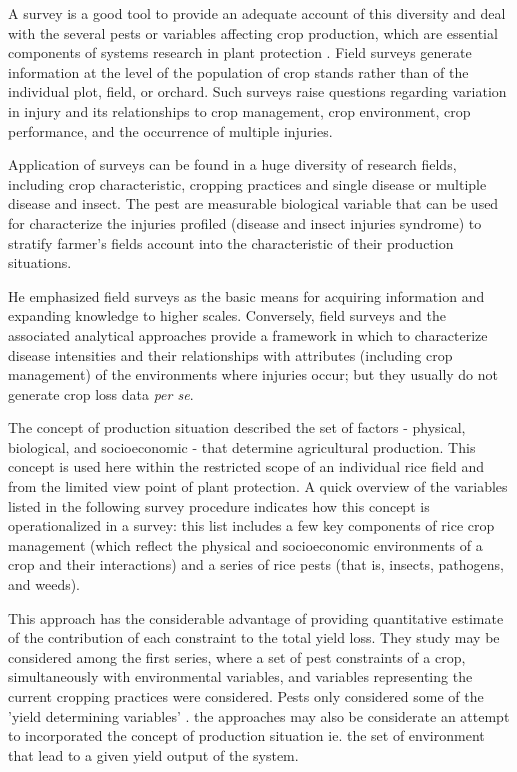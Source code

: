 A survey is a good tool to provide an adequate account of this diversity and deal with the several pests or variables affecting crop production, which are essential components of systems research in plant protection \citet{Zadoks:1979ts}. Field surveys generate information at the level of the population of crop stands rather than of the individual plot, field, or orchard. Such surveys raise questions regarding variation in injury and its relationships to crop management, crop environment, crop performance, and the occurrence of multiple injuries.

Application of surveys can be found in a huge diversity of research fields, including crop characteristic, cropping practices and single disease or multiple disease and insect. The pest are measurable biological variable that can be used for characterize the injuries profiled (disease and insect injuries syndrome) to stratify farmer's fields account into the characteristic of their production situations.

He emphasized field surveys as the basic means for acquiring information and expanding knowledge to higher scales. Conversely, field surveys and the associated analytical approaches provide a framework in which to characterize disease intensities and their relationships with attributes (including crop management) of the environments where injuries occur; but they usually do not generate crop loss data \textit{per se}.

The concept of production situation described the set of factors - physical, biological, and socioeconomic - that determine agricultural production. This concept is used here within the restricted scope of an individual rice field and from the limited view point of plant protection. A quick overview of the variables listed in the following survey procedure indicates how this concept is operationalized in a survey: this list includes a few key components of rice crop management (which reflect the physical and socioeconomic environments of a crop and their interactions) and a series of rice pests (that is, insects, pathogens, and weeds).

This approach has the considerable advantage of providing quantitative estimate of the contribution of each constraint to the total yield loss. They study may be considered among the first series, where a set of pest constraints of a crop, simultaneously with environmental variables, and variables representing the current cropping practices were considered. Pests only considered some of the 'yield determining variables' . the approaches may also be considerate an attempt to incorporated the concept of production situation ie. the set of environment that lead to a given yield output of the system. 

